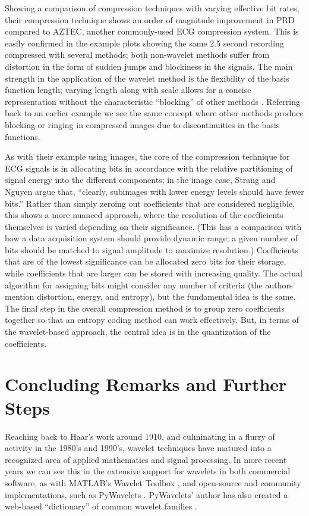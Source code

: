 \documentclass[letterpaper]{article}
\begin{document}
Showing a comparison of compression techniques with varying effective bit rates, 
their compression technique shows an order of magnitude improvement in PRD compared to AZTEC,
another commonly-used ECG compression system.
This is easily confirmed in the example plots showing the same 2.5 second recording compressed with several methods;
both non-wavelet methods suffer from distortion in the form of sudden jumps and blockiness in the signals.
The main strength in the application of the wavelet method is the flexibility of the basis function length;
varying length along with scale allows for a concise representation without the characteristic ``blocking'' of other methods \cite[p.~368]{strang}.
Referring back to an earlier example we see the same concept where other methods produce blocking or ringing in compressed images
due to discontinuities in the basis functions.

As with their example using images, the core of the compression technique for ECG signals is in
allocating bits in accordance with the relative partitioning of signal energy into the different components;
in the image case, Strang and Nguyen argue that, ``clearly, subimages with lower energy levels should have fewer bits.''
Rather than simply zeroing out coefficients that are considered negligible,
this shows a more nuanced approach,
where the resolution of the coefficients themselves is varied depending on their significance.
(This has a comparison with how a data acquisition system should provide dynamic range;
a given number of bits should be matched to signal amplitude to maximize resolution.)
Coefficients that are of the lowest significance can be allocated zero bits for their storage,
while coefficients that are larger can be stored with increasing quality.
The actual algorithm for assigning bits might consider any number of criteria (the authors mention distortion, energy, and entropy),
but the fundamental idea is the same.
The final step in the overall compression method is to group zero coefficients together
so that an entropy coding method can work effectively.
But, in terms of the wavelet-based approach, the central idea is in the quantization of the coefficients.

\section{Concluding Remarks and Further Steps}

Reaching back to Haar's work around 1910, and culminating in a flurry of activity in the 1980's and 1990's,
wavelet techniques have matured into a recognized area of applied mathematics and signal processing.
In more recent years we can see this in the extensive support for wavelets in both commercial software,
as with MATLAB's Wavelet Toolbox \cite{wavelettoolbox}, and open-source and community implementations,
such as PyWavelets \cite{pywavelets}.
PyWavelets' author has also created a web-based ``dictionary'' of common wavelet families \cite{waveletbrowser}.
\end{document}
